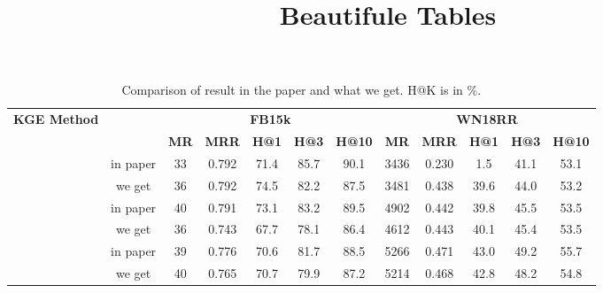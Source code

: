 \documentclass{article}
\title{Beautifule Tables}
\begin{document}
	
	\maketitle
	
	\begin{table}[bht]
		\caption{Comparison of result in the paper and what we get. H@K is in \%.}
		\label{tab::results-kge}
		\begin{center}
			\scalebox{0.75}
			{
				\begin{tabular}{c c |c c c c c | c c c c c}\hline
					\multirow{2}{*}{\textbf{KGE Method}}	& \multirow{2}{*}{\textbf{}} & \multicolumn{5}{c|}{\textbf{FB15k}} & \multicolumn{5}{c}{\textbf{WN18RR}}	\\
					& & \textbf{MR} & \textbf{MRR} & \textbf{H@1} & \textbf{H@3} & \textbf{H@10} & \textbf{MR} & \textbf{MRR} & \textbf{H@1} & \textbf{H@3} & \textbf{H@10} \\ 
					\hline
					& in paper & 33 & 0.792 & 71.4 & 85.7 & 90.1 & 3436 & 0.230 & 1.5 & 41.1 & 53.1 \\
					\rowcolor{green}  %
					\multirow{-2}{*}{\textbf{TransE}}  %
					& we get & 36 & 0.792 & 74.5 & 82.2 & 87.5 & 3481 & 0.438 & 39.6 & 44.0 & 53.2 \\
					\hline
					& in paper & 40 & 0.791 & 73.1 & 83.2 & 89.5 & 4902 & 0.442 & 39.8 & 45.5 & 53.5 \\
					\rowcolor{green}
					\multirow{-2}{*}{\textbf{DistMult}} 
					& we get & 36 & 0.743 & 67.7 & 78.1 & 86.4 & 4612 & 0.443 & 40.1 & 45.4 & 53.5 \\
					\hline
					& in paper & 39 & 0.776 & 70.6 & 81.7 & 88.5 & 5266 & 0.471 & 43.0 & 49.2 & 55.7 \\
					\rowcolor{green}
					\multirow{-2}{*}{\textbf{ComplEx}} 
					& we get & 40 & 0.765 & 70.7 & 79.9 & 87.2 & 5214 & 0.468 & 42.8 & 48.2 & 54.8 \\
					\hline
				\end{tabular}
			}
		\end{center}
		\vspace{-0.15cm}
	\end{table}
\end{document}
